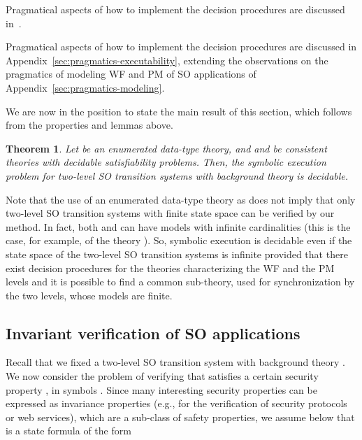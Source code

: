 \documentclass[conference]{IEEEtran}
\newtheorem{theorem}{Theorem}
\newcommand{\close}{\IEEEQEDclosed}
\begin{document}
\begin{SHORT}
Pragmatical aspects of how to implement the decision procedures are discussed in~\cite{BRV-TR09}.
\end{SHORT}
\begin{LONG}
Pragmatical aspects of how to implement the decision procedures are discussed in Appendix~\ref{sec:pragmatics-executability}, extending the observations on the pragmatics of modeling WF and PM of SO applications of Appendix~\ref{sec:pragmatics-modeling}.
\end{LONG}

We are now in the position to state the main result of this section, which follows from the properties and lemmas above.
\begin{theorem}
  Let  be an enumerated data-type theory, and  and  be consistent theories with
  decidable satisfiability problems.  Then, the symbolic execution
  problem for two-level SO transition systems with background theory
   is decidable. \hfill \close
\end{theorem}

Note that the use of an enumerated data-type theory as 
does not imply that only two-level SO transition systems with finite state space can
be verified by our method.  In fact, both  and  can
have models with infinite cardinalities (this is the case, for
example, of the theory ).  So, symbolic execution is
decidable even if the state space of the two-level SO transition systems is infinite
provided that there exist decision procedures for the theories
characterizing the WF and the PM levels and it is possible to
find a common sub-theory, used for synchronization by the two levels,
whose models are finite.  

\subsection{Invariant verification of SO applications}
\label{sec:inv-so-apps}

Recall that we fixed a two-level SO transition system
 with background
theory .  We now consider the problem of verifying that 
 satisfies a certain security property
, in symbols .  Since many interesting
security properties can be expressed as invariance properties (e.g., for the verification of security protocols or web services), which are a sub-class of safety properties, we assume
below that  is a state formula of the form
\end{document}
